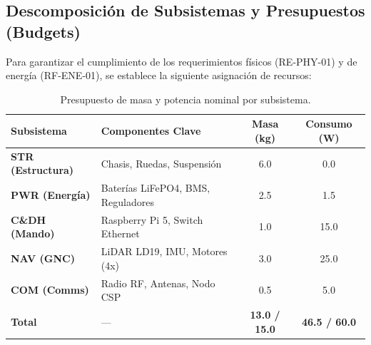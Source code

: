\subsection{Descomposición de Subsistemas y Presupuestos (Budgets)}
Para garantizar el cumplimiento de los requerimientos físicos (RE-PHY-01) y de energía (RF-ENE-01), se establece la siguiente asignación de recursos:

\begin{table}[H]
    \centering
    \begin{tabularx}{\textwidth}{|l|X|c|c|}
        \hline
        \rowcolor{AgencyBlue!20} \textbf{Subsistema} & \textbf{Componentes Clave} & \textbf{Masa (kg)} & \textbf{Consumo (W)} \\ \hline
        \textbf{STR (Estructura)} & Chasis, Ruedas, Suspensión & 6.0 & 0.0 \\ \hline
        \textbf{PWR (Energía)} & Baterías LiFePO4, BMS, Reguladores & 2.5 & 1.5 \\ \hline
        \textbf{C\&DH (Mando)} & Raspberry Pi 5, Switch Ethernet & 1.0 & 15.0 \\ \hline
        \textbf{NAV (GNC)} & LiDAR LD19, IMU, Motores (4x) & 3.0 & 25.0 \\ \hline
        \textbf{COM (Comms)} & Radio RF, Antenas, Nodo CSP & 0.5 & 5.0 \\ \hline
        \rowcolor{gray!10} \textbf{Total} & --- & \textbf{13.0 / 15.0} & \textbf{46.5 / 60.0} \\ \hline
    \end{tabularx}
    \caption{Presupuesto de masa y potencia nominal por subsistema.}
\end{table}


